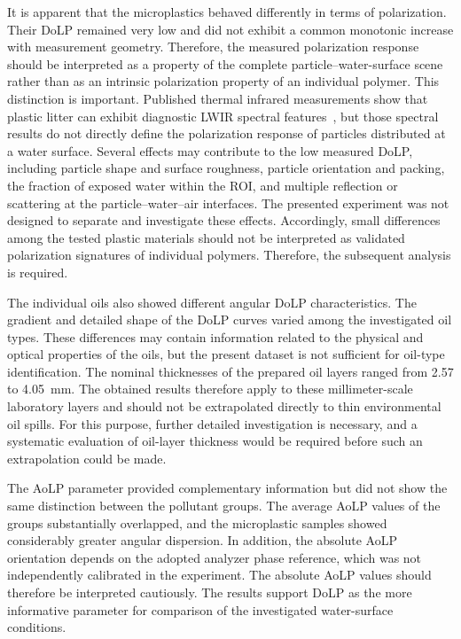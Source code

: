 \documentclass[pdflatex,sn-apa]{sn-jnl}
\begin{document}
It is apparent that the microplastics behaved differently in terms of polarization. Their DoLP remained very low and did not exhibit a common monotonic increase with measurement geometry. Therefore, the measured polarization response should be interpreted as a property of the complete particle--water-surface scene rather than as an intrinsic polarization property of an individual polymer. This distinction is important. Published thermal infrared measurements show that plastic litter can exhibit diagnostic LWIR spectral features~\citep{Garaba2020}, but those spectral results do not directly define the polarization response of particles distributed at a water surface. Several effects may contribute to the low measured DoLP, including particle shape and surface roughness, particle orientation and packing, the fraction of exposed water within the ROI, and multiple reflection or scattering at the particle--water--air interfaces. The presented experiment was not designed to separate and investigate these effects. Accordingly, small differences among the tested plastic materials should not be interpreted as validated polarization signatures of individual polymers. Therefore, the subsequent analysis is required.

The individual oils also showed different angular DoLP characteristics. The gradient and detailed shape of the DoLP curves varied among the investigated oil types. These differences may contain information related to the physical and optical properties of the oils, but the present dataset is not sufficient for oil-type identification. The nominal thicknesses of the prepared oil layers ranged from 2.57 to 4.05~mm. The obtained results therefore apply to these millimeter-scale laboratory layers and should not be extrapolated directly to thin environmental oil spills. For this purpose, further detailed investigation is necessary, and a systematic evaluation of oil-layer thickness would be required before such an extrapolation could be made.

The AoLP parameter provided complementary information but did not show the same distinction between the pollutant groups. The average AoLP values of the groups substantially overlapped, and the microplastic samples showed considerably greater angular dispersion. In addition, the absolute AoLP orientation depends on the adopted analyzer phase reference, which was not independently calibrated in the experiment. The absolute AoLP values should therefore be interpreted cautiously. The results support DoLP as the more informative parameter for comparison of the investigated water-surface conditions.
\end{document}
